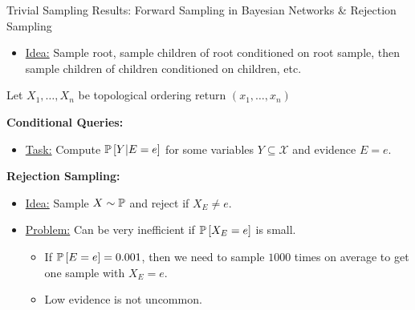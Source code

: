 \begin{frame}{Trivial Sampling Results: Forward Sampling in Bayesian Networks \& Rejection Sampling}
\begin{itemize}
    \item \underline{Idea:} Sample root, \pause sample children of root conditioned on root sample, \pause then sample children of children conditioned on children, etc.
\end{itemize}
\pause
\begin{algorithm}[H]
\caption{Forward Sampling in a Bayesian Network}
\label{alg:forward-sampling-bayesian-network}
Let $X_1,\ldots,X_n$ be topological ordering\;
\pause
{}
\pause
return $(x_1,\ldots,x_n)$\;
\end{algorithm}

\pause

\textbf{Conditional Queries:}

    \begin{itemize}
    \item \underline{Task:} Compute $\Pb[Y | E = e]$ for some variables $Y \subseteq \mathcal{X}$ and evidence $E = e$.
    \end{itemize}
    \pause
    \textbf{Rejection Sampling:}
    \begin{itemize}
    \item \underline{Idea:}  Sample $X \sim \Pb$ and reject if $X_E \neq e$.
    \pause \item \underline{Problem:} Can be very inefficient if $\Pb[X_E = e]$ is small.
    \begin{itemize}
        \pause \item If $\Pb[E = e] = 0.001$, then we need to sample $1000$ times on average to get one sample with $X_E = e$.
        \pause \item Low evidence is not uncommon.
    \end{itemize}
    \end{itemize}
\end{frame}

